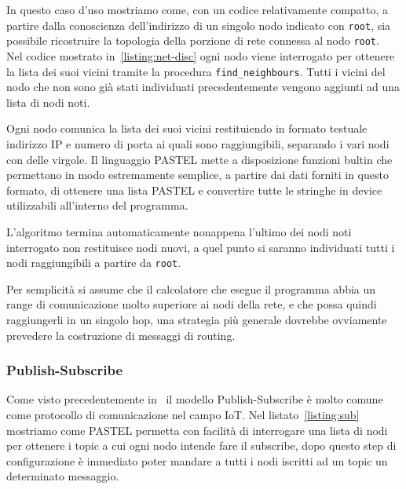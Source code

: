 \documentclass[10pt]{article}
\begin{document}
In questo caso d'uso mostriamo come, con un codice relativamente compatto, a partire dalla conoscienza dell'indirizzo di un singolo nodo indicato con \texttt{root}, sia possibile ricostruire la topologia della porzione di rete connessa al nodo \texttt{root}.\\
Nel codice mostrato in~\ref{listing:net-disc} ogni nodo viene interrogato per ottenere la lista dei suoi vicini tramite la procedura \texttt{find\_neighbours}. Tutti i vicini del nodo che non sono già stati individuati precedentemente vengono aggiunti ad una lista di nodi noti.

Ogni nodo comunica la lista dei suoi vicini restituiendo in formato testuale indirizzo IP e numero di porta ai quali sono raggiungibili, separando i vari nodi con delle virgole. Il linguaggio PASTEL mette a disposizione funzioni bultin che permettono in modo estremamente semplice, a partire dai dati forniti in questo formato, di ottenere una lista PASTEL e convertire tutte le stringhe in device utilizzabili all'interno del programma.

L'algoritmo termina automaticamente nonappena l'ultimo dei nodi noti interrogato non restituisce nodi nuovi, a quel punto si saranno individuati tutti i nodi raggiungibili a partire da \texttt{root}.

Per semplicità si assume che il calcolatore che esegue il programma abbia un range di comunicazione molto superiore ai nodi della rete, e che possa quindi raggiungerli in un singolo hop, una strategia più generale dovrebbe ovviamente prevedere la costruzione di messaggi di routing.



\subsubsection{Publish-Subscribe}\label{subsubsection:pub-sub}

Come visto precedentemente in~\cite{tandale2017empirical} il modello Publish-Subscribe è molto comune come protocollo di comunicazione nel campo IoT. Nel listato~\ref{listing:sub} mostriamo come PASTEL permetta con facilità di interrogare una lista di nodi per ottenere i topic a cui ogni nodo intende fare il subscribe, dopo questo step di configurazione è immediato poter mandare a tutti i nodi iscritti ad un topic un determinato messaggio.
\end{document}
